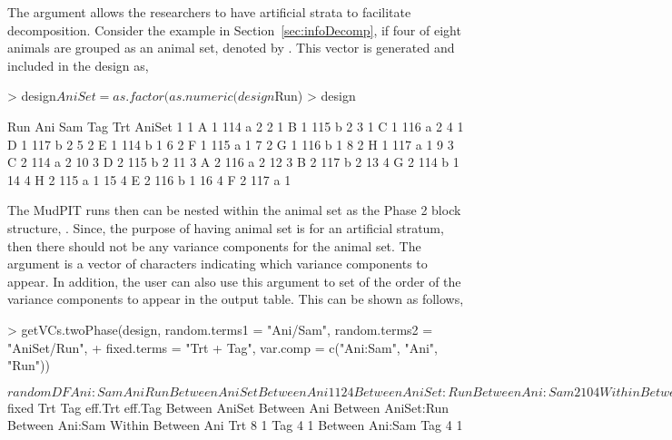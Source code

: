 \documentclass[article]{jss}
\begin{document}
The  argument allows the researchers to have artificial strata to facilitate decomposition. Consider the example in Section~\ref{sec:infoDecomp}, if four of eight animals are grouped as an animal set, denoted by . This vector is generated and included in the design as,
\begin{CodeChunk}
\begin{CodeInput}
> design$AniSet = as.factor(as.numeric(design$Run)%
> design
\end{CodeInput}
\begin{CodeOutput}
   Run Ani Sam Tag Trt AniSet
1    1   A   1 114   a      2
2    1   B   1 115   b      2
3    1   C   1 116   a      2
4    1   D   1 117   b      2
5    2   E   1 114   b      1
6    2   F   1 115   a      1
7    2   G   1 116   b      1
8    2   H   1 117   a      1
9    3   C   2 114   a      2
10   3   D   2 115   b      2
11   3   A   2 116   a      2
12   3   B   2 117   b      2
13   4   G   2 114   b      1
14   4   H   2 115   a      1
15   4   E   2 116   b      1
16   4   F   2 117   a      1
\end{CodeOutput}
\end{CodeChunk}

The MudPIT runs then can be nested within the animal set as the Phase 2 block structure, . Since, the purpose of having animal set is for an artificial stratum, then there should not be any variance components for the animal set. The  argument is a vector of characters indicating which variance components to appear. In addition, the user can also use this argument to set of the order of the variance components to appear in the output table. This can be shown as follows,
\begin{CodeChunk}
\begin{CodeInput}
> getVCs.twoPhase(design, random.terms1 = "Ani/Sam", random.terms2 = "AniSet/Run", 
+ fixed.terms = "Trt + Tag", var.comp = c("Ani:Sam", "Ani", "Run"))                                    
\end{CodeInput}
\begin{CodeOutput}
$random
                   DF Ani:Sam Ani Run
Between AniSet                       
   Between Ani     1  1       2   4  
Between AniSet:Run                   
   Between Ani:Sam 2  1       0   4  
Within                               
   Between Ani                       
      Trt          1  1       2   0  
      Tag          1  1       2   0  
      Residual     4  1       2   0  
   Between Ani:Sam                   
      Tag          2  1       0   0  
      Residual     4  1       0   0  

$fixed
                   Trt Tag eff.Trt eff.Tag
Between AniSet                            
  Between Ani                             
Between AniSet:Run                        
  Between Ani:Sam                         
Within                                    
  Between Ani                             
   Trt             8       1              
   Tag                 4           1      
  Between Ani:Sam                         
   Tag                 4           1      
\end{CodeOutput}
\end{CodeChunk}
\end{document}
